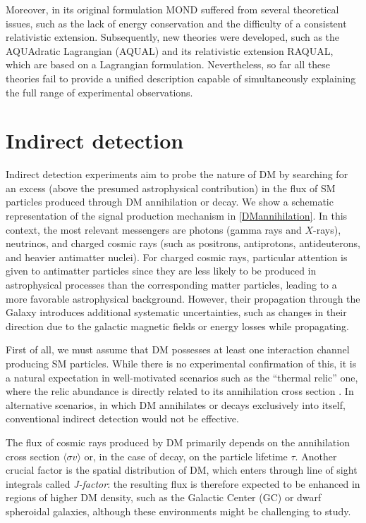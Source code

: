 Moreover, in its original formulation MOND suffered from several theoretical issues, such as the lack of energy conservation and the difficulty of a consistent relativistic extension.
Subsequently, new theories were developed, such as the AQUAdratic Lagrangian (AQUAL) \cite{AQUAL} and its relativistic extension RAQUAL, which are based on a Lagrangian formulation. 
Nevertheless, so far all these theories fail to provide a unified description capable of simultaneously explaining the full range of experimental observations.



\section{Indirect detection}


Indirect detection experiments aim to probe the nature of DM by searching for an excess (above the presumed astrophysical contribution) in the flux of SM particles produced through DM annihilation or decay. We show a schematic representation of the signal production mechanism in \cref{DMannihilation}.
In this context, the most relevant messengers are photons (gamma rays and $X$-rays), neutrinos, and charged cosmic rays (such as positrons, antiprotons, antideuterons, and heavier antimatter nuclei).
For charged cosmic rays, particular attention is given to antimatter particles since they are less likely to be produced in astrophysical processes than the corresponding matter particles, leading to a more favorable astrophysical background. However, their propagation through the Galaxy introduces additional systematic uncertainties, such as changes in their direction due to the galactic magnetic fields or energy losses while propagating.

First of all, we must assume that DM possesses at least one interaction channel producing SM particles. While there is no experimental confirmation of this, it is a natural expectation in well-motivated scenarios such as the ``thermal relic'' one, where the relic abundance is directly related to its annihilation cross section \cite{Slatyer}.
In alternative scenarios, in which DM annihilates or decays exclusively into itself, conventional indirect detection would not be effective.

The flux of cosmic rays produced by DM primarily depends on the annihilation cross section $\langle\sigma v\rangle$ or, in the case of decay, on the particle lifetime $\tau$.
Another crucial factor is the spatial distribution of DM, which enters through line of sight integrals called \emph{J-factor}: the resulting flux is therefore expected to be enhanced in regions of higher DM density, such as the Galactic Center (GC) or dwarf spheroidal galaxies, although these environments might be challenging to study. 



